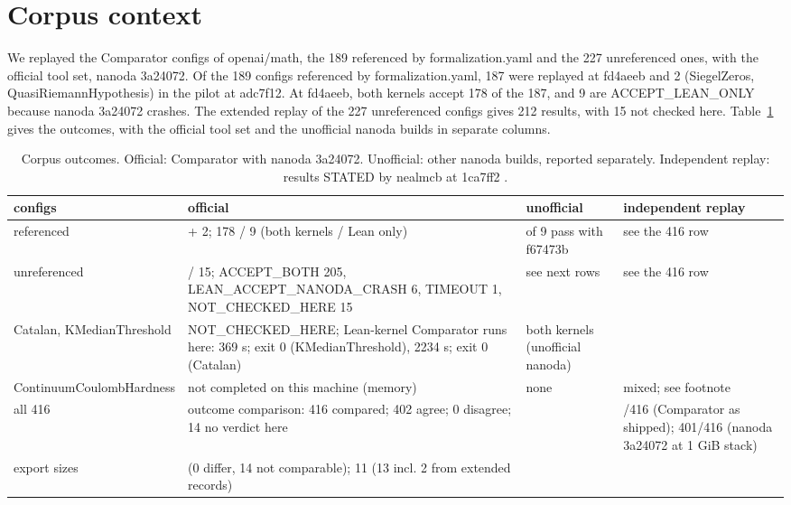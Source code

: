 \section{Corpus context}\label{sec:corpus}

We replayed the Comparator configs of openai/math, the 189 referenced by formalization.yaml and the 227 unreferenced ones, with the official tool set, nanoda 3a24072. %
Of the 189 configs referenced by formalization.yaml, 187 were replayed at fd4aeeb and 2 (SiegelZeros, QuasiRiemannHypothesis) in the pilot at adc7f12. %
At fd4aeeb, both kernels accept 178 of the 187, and 9 are ACCEPT\_LEAN\_ONLY because nanoda 3a24072 crashes. %
The extended replay of the 227 unreferenced configs gives 212 results, with 15 not checked here. %
Table~\ref{tab:corpus} gives the outcomes, with the official tool set and the unofficial nanoda builds in separate columns. %

\begin{table}[tbp]
\caption{Corpus outcomes. Official: Comparator with nanoda 3a24072. Unofficial: other nanoda builds, reported separately. Independent replay: results STATED by nealmcb at 1ca7ff2 \cite{mcburnett-tooling}.}\label{tab:corpus} %
\small
\begin{tabularx}{\textwidth}{@{}>{\raggedright\arraybackslash}p{2.6cm}>{\raggedright\arraybackslash}X>{\raggedright\arraybackslash}p{2.6cm}>{\raggedright\arraybackslash}p{3.0cm}@{}}
\toprule
configs & official & unofficial & independent replay \\ %
\midrule
189 referenced & 187 + 2; 178 / 9 (both kernels / Lean only) & 9 of 9 pass with f67473b & see the 416 row \\ %
227 unreferenced & 212 / 15; ACCEPT\_BOTH 205, LEAN\_ACCEPT\_NANODA\_CRASH 6, TIMEOUT 1, NOT\_CHECKED\_HERE 15 & see next rows & see the 416 row \\ %
Catalan, KMedianThreshold & NOT\_CHECKED\_HERE; Lean-kernel Comparator runs here: 369 s; exit 0 (KMedianThreshold), 2234 s; exit 0 (Catalan) & both kernels (unofficial nanoda) & 10 \\ %
Continuum\-Coulomb\-Hardness & not completed on this machine (memory) & none & mixed; see footnote \\ %
all 416 & outcome comparison: 416 compared; 402 agree; 0 disagree; 14 no verdict here & & 416/416 (Comparator as shipped); 401/416 (nanoda 3a24072 at 1 GiB stack) \cite{nanoda-issue-55} \\ %
export sizes & 146 (0 differ, 14 not comparable); 11 (13 incl. 2 from extended records) & & \\ %
\bottomrule
\end{tabularx}
\end{table}

